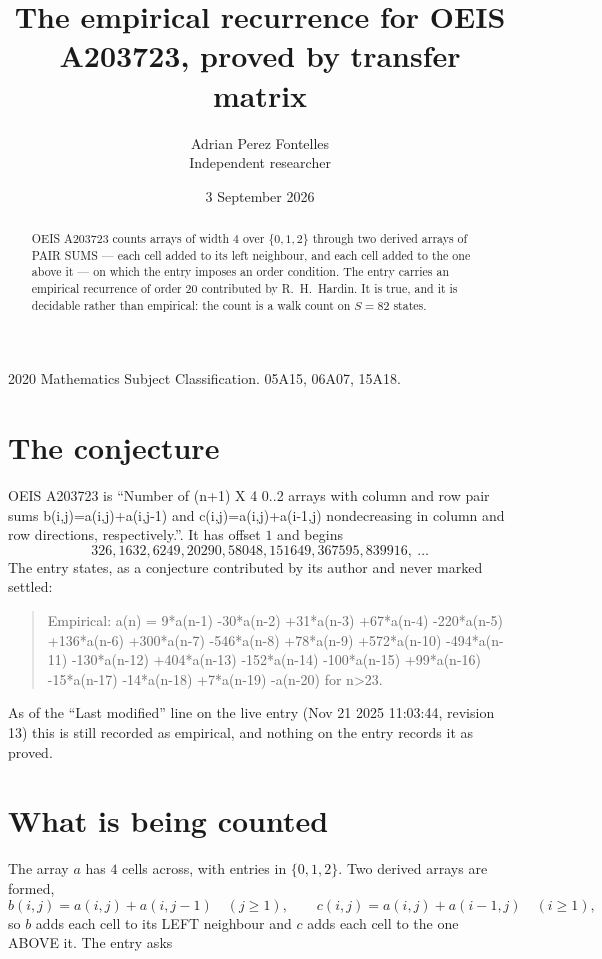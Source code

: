 \documentclass[11pt,a4paper]{article}
\title{The empirical recurrence for OEIS A203723, proved by transfer matrix}
\author{Adrian Perez Fontelles\\ \small Independent researcher}
\date{3 September 2026}
\theoremstyle{plain}
\theoremstyle{definition}
\begin{document}
\maketitle

\begin{abstract}
OEIS A203723 counts arrays of width $4$ over $\{0,1,2\}$ through two derived arrays of PAIR SUMS ---
each cell added to its left neighbour, and each cell added to the one above it --- on which the
entry imposes an order condition. The entry carries an empirical recurrence of order $20$
contributed by R.~H.~Hardin. It is true, and it is decidable rather than empirical: the count is
a walk count on $S=82$ states.
\end{abstract}

\noindent\small 2020 Mathematics Subject Classification. 05A15, 06A07, 15A18.\normalsize

\section{The conjecture}

OEIS A203723 is ``Number of (n+1) X 4 0..2 arrays with column and row pair sums b(i,j)=a(i,j)+a(i,j-1) and c(i,j)=a(i,j)+a(i-1,j) nondecreasing in column and row directions, respectively.''. It has offset $1$ and begins
\[
326, 1632, 6249, 20290, 58048, 151649, 367595, 839916,\ \dots
\]
The entry states, as a conjecture contributed by its author and never marked settled:
\begin{quote}
Empirical: a(n) = 9*a(n-1) -30*a(n-2) +31*a(n-3) +67*a(n-4) -220*a(n-5) +136*a(n-6) +300*a(n-7) -546*a(n-8) +78*a(n-9) +572*a(n-10) -494*a(n-11) -130*a(n-12) +404*a(n-13) -152*a(n-14) -100*a(n-15) +99*a(n-16) -15*a(n-17) -14*a(n-18) +7*a(n-19) -a(n-20) for n>23.
\end{quote}
As of the ``Last modified'' line on the live entry (Nov 21 2025 11:03:44, revision 13) this is still
recorded as empirical, and nothing on the entry records it as proved.

\section{What is being counted}

The array $a$ has $4$ cells across, with entries in $\{0,1,2\}$. Two derived arrays are formed,
\[
b(i,j)=a(i,j)+a(i,j-1)\quad(j\ge1),\qquad c(i,j)=a(i,j)+a(i-1,j)\quad(i\ge1),
\]
so $b$ adds each cell to its LEFT neighbour and $c$ adds each cell to the one ABOVE it. The
entry asks
\end{document}
